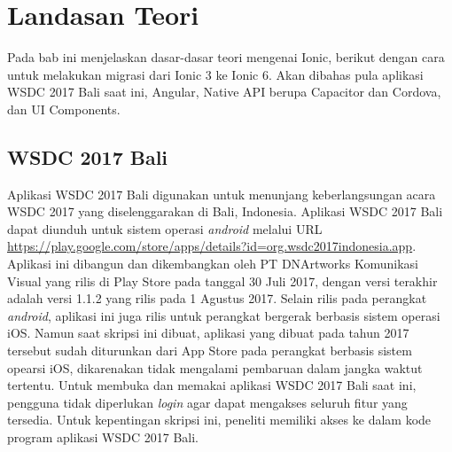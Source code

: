 \setcounter{secnumdepth}{4}
\chapter{Landasan Teori}
\label{chap:teori}

Pada bab ini menjelaskan dasar-dasar teori mengenai Ionic, berikut dengan cara untuk melakukan migrasi dari Ionic 3 ke Ionic 6. Akan dibahas pula aplikasi WSDC 2017 Bali saat ini, Angular, Native API berupa Capacitor dan Cordova, dan UI Components.

\section{WSDC 2017 Bali}
\label{sec:wsdc2017bali}

Aplikasi WSDC 2017 Bali digunakan untuk menunjang keberlangsungan acara WSDC 2017 yang diselenggarakan di Bali, Indonesia. Aplikasi WSDC 2017 Bali dapat diunduh untuk sistem operasi {\it android} melalui URL \url{https://play.google.com/store/apps/details?id=org.wsdc2017indonesia.app}. Aplikasi ini dibangun dan dikembangkan oleh PT DNArtworks Komunikasi Visual yang rilis di Play Store pada tanggal 30 Juli 2017, dengan versi terakhir adalah versi 1.1.2 yang rilis pada 1 Agustus 2017. Selain rilis pada perangkat {\it android}, aplikasi ini juga rilis untuk perangkat bergerak berbasis sistem operasi iOS. Namun saat skripsi ini dibuat, aplikasi yang dibuat pada tahun 2017 tersebut sudah diturunkan dari App Store pada perangkat berbasis sistem opearsi iOS, dikarenakan tidak mengalami pembaruan dalam jangka waktut tertentu. Untuk membuka dan memakai aplikasi WSDC 2017 Bali saat ini, pengguna tidak diperlukan {\it login} agar dapat mengakses seluruh fitur yang tersedia. Untuk kepentingan skripsi ini, peneliti memiliki akses ke dalam kode program aplikasi WSDC 2017 Bali.

